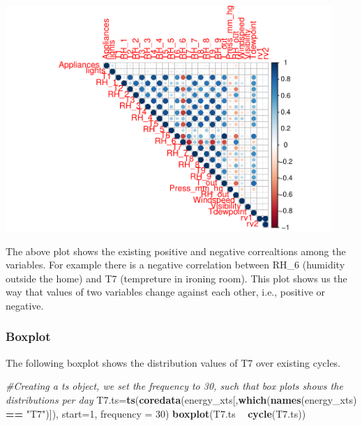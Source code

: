 \documentclass[]{article}
\newenvironment{Shaded}{\begin{snugshade}}{\end{snugshade}}
\newcommand{\KeywordTok}[1]{\textcolor[rgb]{0.13,0.29,0.53}{\textbf{#1}}}
\newcommand{\DataTypeTok}[1]{\textcolor[rgb]{0.13,0.29,0.53}{#1}}
\newcommand{\DecValTok}[1]{\textcolor[rgb]{0.00,0.00,0.81}{#1}}
\newcommand{\StringTok}[1]{\textcolor[rgb]{0.31,0.60,0.02}{#1}}
\newcommand{\CommentTok}[1]{\textcolor[rgb]{0.56,0.35,0.01}{\textit{#1}}}
\newcommand{\OperatorTok}[1]{\textcolor[rgb]{0.81,0.36,0.00}{\textbf{#1}}}
\newcommand{\NormalTok}[1]{#1}
\begin{document}
\includegraphics[width=468]{README_figs/README-unnamed-chunk-6-1}

The above plot shows the existing positive and negative correaltions
among the variables. For example there is a negative correlation between
RH\_6 (humidity outside the home) and T7 (tempreture in ironing room).
This plot shows us the way that values of two variables change against
each other, i.e., positive or negative.

\subsubsection{Boxplot}\label{boxplot}

The following boxplot shows the distribution values of T7 over existing
cycles.

\begin{Shaded}
\begin{Highlighting}[]
\CommentTok{#Creating a ts object, we set the frequency to 30, such that box plots shows the distributions per day}
\NormalTok{T7.ts=}\KeywordTok{ts}\NormalTok{(}\KeywordTok{coredata}\NormalTok{(energy_xts[,}\KeywordTok{which}\NormalTok{(}\KeywordTok{names}\NormalTok{(energy_xts) }\OperatorTok{==}\StringTok{ "T7"}\NormalTok{)]), }\DataTypeTok{start=}\DecValTok{1}\NormalTok{, }\DataTypeTok{frequency =} \DecValTok{30}\NormalTok{)}
\KeywordTok{boxplot}\NormalTok{(T7.ts }\OperatorTok{~}\StringTok{ }\KeywordTok{cycle}\NormalTok{(T7.ts))}
\end{Highlighting}
\end{Shaded}
\end{document}
